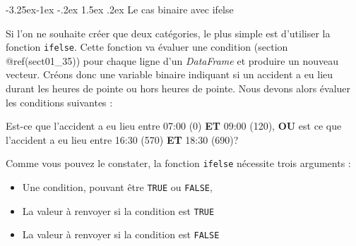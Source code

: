 \documentclass[
  11pt,
  french,
]{book}
\makeatletter
\newenvironment{Shaded}{\begin{snugshade}}{\end{snugshade}}
\newcommand{\DecValTok}[1]{\textcolor[rgb]{0.00,0.00,0.81}{#1}}
\newcommand{\KeywordTok}[1]{\textcolor[rgb]{0.13,0.29,0.53}{\textbf{#1}}}
\newcommand{\NormalTok}[1]{#1}
\newcommand{\OperatorTok}[1]{\textcolor[rgb]{0.81,0.36,0.00}{\textbf{#1}}}
\newcommand{\StringTok}[1]{\textcolor[rgb]{0.31,0.60,0.02}{#1}}
\providecommand{\tightlist}{%
  \setlength{\itemsep}{0pt}\setlength{\parskip}{0pt}}
\newenvironment{kframe}{%
\medskip{}
\setlength{\fboxsep}{.8em}
 \def\at@end@of@kframe{}%
 \ifinner\ifhmode%
  \def\at@end@of@kframe{\end{minipage}}%
  \begin{minipage}{\columnwidth}%
 \fi\fi%
 \def\FrameCommand##1{\hskip\@totalleftmargin \hskip-\fboxsep
 \colorbox{shadecolor}{##1}\hskip-\fboxsep
     \hskip-\linewidth \hskip-\@totalleftmargin \hskip\columnwidth}%
 \MakeFramed {\advance\hsize-\width
   \@totalleftmargin\z@ \linewidth\hsize
   \@setminipage}}%
 {\par\unskip\endMakeFramed%
 \at@end@of@kframe}
\renewenvironment{Shaded}{\begin{kframe}}{\end{kframe}}
\renewcommand\paragraph{\@startsection{paragraph}{4}{\z@}%
   {-3.25ex\@plus -1ex \@minus -.2ex}%
   {1.5ex \@plus .2ex}%
   {\normalfont\normalsize\bfseries}}
\makeatother
\begin{document}
\hypertarget{sect014271}{%
\paragraph{Le cas binaire avec ifelse}\label{sect014271}}

Si l'on ne souhaite créer que deux catégories, le plus simple est d'utiliser la fonction \texttt{ifelse}. Cette fonction va évaluer une condition (section @ref(sect01\_35)) pour chaque ligne d'un \emph{DataFrame} et produire un nouveau vecteur. Créons donc une variable binaire indiquant si un accident a eu lieu durant les heures de pointe ou hors heures de pointe. Nous devons alors évaluer les conditions suivantes :

Est-ce que l'accident a eu lieu entre 07:00 (0) \textbf{ET} 09:00 (120), \textbf{OU} est ce que l'accident a eu lieu entre 16:30 (570) \textbf{ET} 18:30 (690)?

\begin{Shaded}
\end{Shaded}

Comme vous pouvez le constater, la fonction \texttt{ifelse} nécessite trois arguments :

\begin{itemize}
\tightlist
\item
  Une condition, pouvant être \texttt{TRUE} ou \texttt{FALSE},
\item
  La valeur à renvoyer si la condition est \texttt{TRUE}
\item
  La valeur à renvoyer si la condition est \texttt{FALSE}
\end{itemize}
\end{document}
